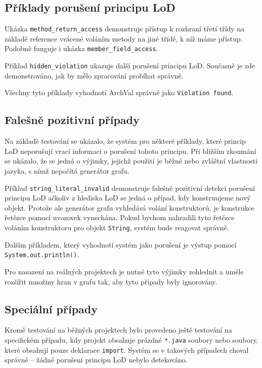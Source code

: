 \subsection{Příklady porušení principu LoD}

Ukázka \verb+method_return_access+ demonstruje přístup k rozhraní třetí třídy na základě reference vrácené voláním metody na jiné třídě, k níž máme přístup. Podobně funguje i ukázka \verb+member_field_access+.

Příklad \verb+hidden_violation+ ukazuje další porušení principu LoD. Současně je zde demonstrováno, jak by mělo zpracování probíhat správně.

Všechny tyto příklady vyhodnotí ArchVal správně jako \verb+Violation found+.

\subsection{Falešně pozitivní případy}

Na základě testování se ukázalo, že systém pro některé příklady, které princip LoD neporušují vrací informaci o porušení tohoto principu. Při bližším zkoumání se ukázalo, že se jedná o výjimky, jejichž použití je běžné nebo zvláštní vlastnosti jazyka, s nímž nepočítá generátor grafu.

Příklad \verb+string_literal_invalid+ demonstruje falešně pozitivní detekci porušení principu LoD ačkoliv z hlediska LoD se jedná o případ, kdy konstruujeme nový objekt. Protože ale generátor grafu vyhledává volání konstruktorů, je konstrukce řetězce pomocí uvozovek vynechána. Pokud bychom nahradili tyto řetězce voláním konstruktoru pro objekt \verb+String+, systém bude reagovat správně.

Dalším příkladem, který vyhodnotí systém jako porušení je výstup pomocí \verb+System.out.println()+.

Pro nasazení na reálných projektech je nutné tyto výjimky zohlednit a uměle rozšířit množiny hran v grafu tak, aby tyto případy byly ignorovány.

\subsection{Speciální případy}

Kromě testování na běžných projektech bylo provedeno ještě testování na specifickém případu, kdy projekt obsahuje prázdné \verb+*.java+ soubory nebo soubory, které obsahují pouze deklarace \verb+import+. Systém se v takových případech choval správně -- žádné porušení principu LoD nebylo detekováno.
